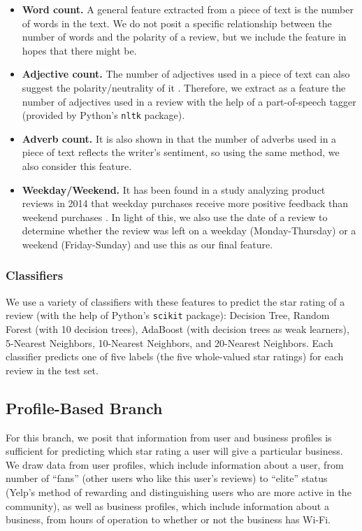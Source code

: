 \begin{itemize}
\item {\bf Word count.} A general feature extracted from a piece of text is the number of words in the text. We do not posit a specific relationship between the number of words and the polarity of a review, but we include the feature in hopes that there might be.

\item {\bf Adjective count.} The number of adjectives used in a piece of text can also suggest the polarity/neutrality of it \cite{adjectives}. Therefore, we extract as a feature the number of adjectives used in a review with the help of a part-of-speech tagger (provided by Python's \texttt{nltk} package).

\item {\bf Adverb count.} It is also shown in \cite{adjectives} that the number of adverbs used in a piece of text reflects the writer's sentiment, so using the same method, we also consider this feature.

\item {\bf Weekday/Weekend.} It has been found in a study analyzing product reviews in 2014 that weekday purchases receive more positive feedback than weekend purchases \cite{online-habit}. In light of this, we also use the date of a review to determine whether the review was left on a weekday (Monday-Thursday) or a weekend (Friday-Sunday) and use this as our final feature.

\end{itemize}

\subsubsection{Classifiers}
We use a variety of classifiers with these features to predict the star rating of a review (with the help of Python's \texttt{scikit} package): Decision Tree, Random Forest (with 10 decision trees), AdaBoost (with decision trees as weak learners), 5-Nearest Neighbors, 10-Nearest Neighbors, and 20-Nearest Neighbors. Each classifier predicts one of five labels (the five whole-valued star ratings) for each review in the test set.

\subsection{Profile-Based Branch}
For this branch, we posit that information from user and business profiles is sufficient for predicting which star rating a user will give a particular business. We draw data from user profiles, which include information about a user, from number of ``fans'' (other users who like this user's reviews) to ``elite'' status (Yelp's method of rewarding and distinguishing users who are more active in the community), as well as business profiles, which include information about a business, from hours of operation to whether or not the business has Wi-Fi.

